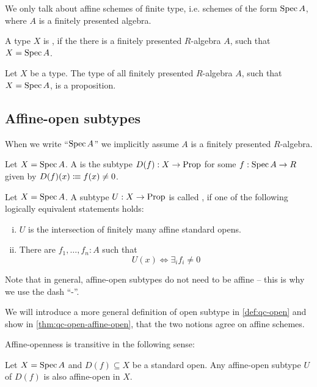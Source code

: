 We only talk about affine schemes of finite type, i.e. schemes of the form $\operatorname{Spec} A$,
where $A$ is a finitely presented algebra.

\begin{definition}%
  A type $X$ is ,
  if the there is a finitely presented $R$-algebra $A$, such that $X=\operatorname{Spec} A$. 
\end{definition}

\begin{proposition}%
  Let $X$ be a type.
  The type of all finitely presented $R$-algebra $A$, such that $X=\operatorname{Spec} A$, is a proposition.
\end{proposition}

\subsection{Affine-open subtypes}

When we write ``$\operatorname{Spec} A$'' we implicitly assume $A$ is a finitely presented $R$-algebra.

\begin{definition}%
  Let $X=\operatorname{Spec} A$.
  A  is the subtype $D(f):X\to\mathrm{Prop}$
  for some $f:\operatorname{Spec} A\to R$ given by $D(f)(x)\vcentcolon\mspace{-1.2mu}\equiv f(x)\neq 0$.
\end{definition}

\begin{definition}%
  \label{def:affine-open}
  Let $X=\operatorname{Spec} A$.
  A subtype $U:X\to\mathrm{Prop}$ is called ,
  if one of the following logically equivalent statements holds:
  \begin{enumerate}[(i)]%
  \item $U$ is the intersection of finitely many affine standard opens.
  \item There are $f_1,\dots,f_n:A$ such that
    \[U(x) \Leftrightarrow \exists_{i}f_i\neq 0 \]
  \end{enumerate}
\end{definition}

Note that in general, affine-open subtypes do not need to be affine
-- this is why we use the dash ``-''.

We will introduce a more general definition of open subtype in \cref{def:qc-open}
and show in \cref{thm:qc-open-affine-open}, that the two notions agree on affine schemes.

Affine-openness is transitive in the following sense:

\begin{lemma}%
  \label{lem:affine-open-trans}
  Let $X=\operatorname{Spec} A$ and $D(f)\subseteq X$ be a standard open.
  Any affine-open subtype $U$ of $D(f)$ is also affine-open in $X$.
\end{lemma}

